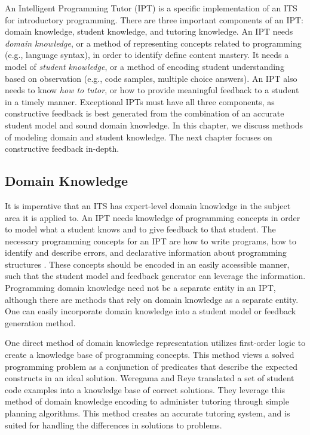 An Intelligent Programming Tutor (IPT) is a specific implementation of an ITS for introductory programming. There are three important components of an IPT: domain knowledge, student knowledge, and tutoring knowledge. An IPT needs \emph{domain knowledge}, or a method of representing concepts related to programming (e.g., language syntax), in order to identify define content mastery. It needs a model of \emph{student knowledge}, or a method of encoding student understanding based on observation (e.g., code samples, multiple choice answers). An IPT also needs to know \emph{how to tutor}, or how to provide meaningful feedback to a student in a timely manner. Exceptional IPTs must have all three components, as constructive feedback is best generated from the combination of an accurate student model and sound domain knowledge. In this chapter, we discuss methods of modeling domain and student knowledge. The next chapter focuses on constructive feedback in-depth.

\subsection{Domain Knowledge}

It is imperative that an ITS has expert-level domain knowledge in the subject area it is applied to. An IPT needs knowledge of programming concepts in order to model what a student knows and to give feedback to that student. The necessary programming concepts for an IPT are how to write programs, how to identify and describe errors, and declarative information about programming structures \cite{Pillay2003}. These concepts should be encoded in an easily accessible manner, such that the student model and feedback generator can leverage the information. Programming domain knowledge need not be a separate entity in an IPT, although there are methods that rely on domain knowledge as a separate entity. One can easily incorporate domain knowledge into a student model or feedback generation method.

One direct method of domain knowledge representation utilizes first-order logic to create a knowledge base of programming concepts. This method views a solved programming problem as a conjunction of predicates that describe the expected constructs in an ideal solution. Weregama and Reye
\cite{Weragama2014} translated a set of student code examples into a knowledge base of correct solutions. They leverage this method of domain knowledge encoding to administer tutoring through simple planning algorithms. This method creates an accurate tutoring system, and is suited for handling the differences in solutions to problems.

